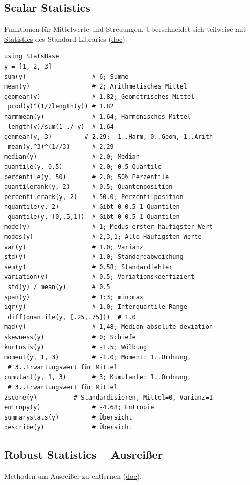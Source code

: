\documentclass[10pt,twocolumn]{scrartcl}
\begin{document}
\subsection{Scalar Statistics}
\label{ssec:StatsBase_ScalarStatistics}

Funktionen für Mittelwerte und Streuungen. Überschneidet sich teilweise mit
\hyperref[ssec:standardLibrary_Statistics]{Statistics} des Standard Libraries
(\href{https://juliastats.org/StatsBase.jl/stable/scalarstats/}{doc}).

\begin{lstlisting}
using StatsBase
y = [1, 2, 3]
sum(y)                  # 6; Summe
mean(y)                 # 2; Arithmetisches Mittel
geomean(y)              # 1.82; Geometrisches Mittel
 prod(y)^(1//length(y)) # 1.82
harmmean(y)             # 1.64; Harmonisches Mittel
 length(y)/sum(1 ./ y)  # 1.64
genmean(y, 3)         # 2.29; -1..Harm, 0..Geom, 1..Arith
 mean(y.^3)^(1//3)      # 2.29
median(y)               # 2.0; Median
quantile(y, 0.5)        # 2.0; 0.5 Quantile
percentile(y, 50)       # 2.0; 50% Perzentile
quantilerank(y, 2)      # 0.5; Quantenposition
percentilerank(y, 2)    # 50.0; Perzentilposition
nquantile(y, 2)         # Gibt 0 0.5 1 Quantilen
 quantile(y, [0,.5,1])  # Gibt 0 0.5 1 Quantilen
mode(y)                 # 1; Modus erster häufigster Wert
modes(y)                # 2,3,1; Alle Häufigsten Werte
var(y)                  # 1.0; Varianz
std(y)                  # 1.0; Standardabweichung
sem(y)                  # 0.58; Standardfehler
variation(y)            # 0.5; Variationskoeffizient
 std(y) / mean(y)       # 0.5
span(y)                 # 1:3; min:max
iqr(y)                  # 1.0; Interquartile Range
 diff(quantile(y, [.25,.75]))  # 1.0
mad(y)                  # 1,48; Median absolute deviation
skewness(y)             # 0; Schiefe
kurtosis(y)             # -1.5; Wölbung
moment(y, 1, 3)         # -1.0; Moment: 1..Ordnung,
 # 3..Erwartungswert für Mittel
cumulant(y, 1, 3)       # 3; Kumulante: 1..Ordnung,
 # 3..Erwartungswert für Mittel
zscore(y)          # Standardisieren, Mittel=0, Varianz=1
entropy(y)              # -4.68; Entropie
summarystats(y)         # Übersicht
describe(y)             # Übersicht
\end{lstlisting}

\subsection{Robust Statistics -- Ausreißer}

Methoden um Ausreißer zu entfernen
(\href{https://juliastats.org/StatsBase.jl/stable/robust/}{doc}).
\end{document}

